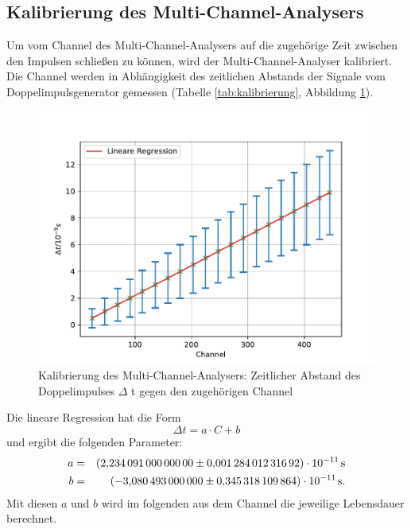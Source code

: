 \subsection{Kalibrierung des Multi-Channel-Analysers}
Um vom Channel des Multi-Channel-Analysers auf die zugehörige Zeit zwischen den Impulsen schließen zu können, wird der Multi-Channel-Analyser kalibriert.
Die Channel werden in Abhängigkeit des zeitlichen Abstands der Signale vom Doppelimpulsgenerator gemessen (Tabelle \ref{tab:kalibrierung}, Abbildung \ref{fig:kalibrierung}).

\begin{figure}[h!]
  \centering
  \includegraphics[width=\textwidth]{figkalibrierung.pdf}
  \caption{Kalibrierung des Multi-Channel-Analysers: Zeitlicher Abstand des Doppelimpulses $\Delta$ t gegen den zugehörigen Channel}
  \label{fig:kalibrierung}
\end{figure}
Die lineare Regression hat die Form
\begin{equation*}
\Delta t = a \cdot C + b
\end{equation*}
und ergibt die folgenden Parameter:
\begin{align*}
a  &=&  \SI{ 2.234091   \pm 0.00128401231692 e-11}{s}  \\
b  &=&  \SI{-3.080493 \pm 0.345318109864 e-11}{s}.  \\
\end{align*}
Mit diesen $a$ und $b$ wird im folgenden aus dem Channel die jeweilige Lebensdauer berechnet.
\FloatBarrier

